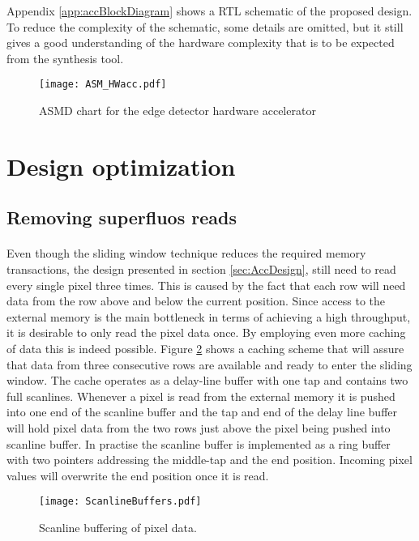 Appendix \ref{app:accBlockDiagram} shows a RTL schematic of the proposed design. To reduce the complexity of the schematic, some details are omitted, but it still gives a good understanding of the hardware complexity that is to be expected from the synthesis tool.

\begin{figure}[H]
	\centering
	\texttt{[image: ASM\_HWacc.pdf]}
	\caption{ASMD chart for the edge detector hardware accelerator}
	\label{fig:ASM_HW}
\end{figure}

\section{Design optimization}
\label{sec:Optimization}
\subsection*{Removing superfluos reads}
\label{sec:memaccess}
\paragraph*{}
Even though the sliding window technique reduces the required memory transactions, the design presented in section \ref{sec:AccDesign}, still need to read every single pixel three times. This is caused by the fact that each row will need data from the row above and below the current position. Since access to the external memory is the main bottleneck in terms of achieving a high throughput, it is desirable to only read the pixel data once. By employing even more caching of data this is indeed possible. Figure \ref{fig:ScanlineBuffers} shows a caching scheme that will assure that data from three consecutive rows are available and ready to enter the sliding window. The cache operates as a delay-line buffer with one tap and contains two full scanlines. Whenever a pixel is read from the external memory it is pushed into one end of the scanline buffer and the tap and end of the delay line buffer will hold pixel data from the two rows just above the pixel being pushed into  scanline buffer. In practise the scanline buffer is implemented as a ring buffer with two pointers addressing the middle-tap and the end position. 
Incoming pixel values will overwrite the end position once it is read.

\begin{figure}[H]
	\centering
	\texttt{[image: ScanlineBuffers.pdf]}
	\caption{Scanline buffering of pixel data.}
	\label{fig:ScanlineBuffers}
\end{figure}

